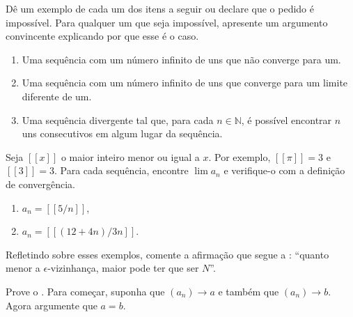 \begin{exercise}\label{ex:2-2-4}
Dê um exemplo de cada um dos itens a seguir ou declare que o pedido é impossível. Para qualquer um que seja impossível, apresente um argumento convincente explicando por que esse é o caso.
\begin{enumerate}[label=\alph*)]
\item Uma sequência com um número infinito de uns que não converge para um.
\item Uma sequência com um número infinito de uns que converge para um limite diferente de um.
\item Uma sequência divergente tal que, para cada $n \in \mathbb{N}$, é possível encontrar $n$ uns consecutivos em algum lugar da sequência.
\end{enumerate}
\end{exercise}

\begin{exercise}\label{ex:2-2-5}
Seja $[[x]]$ o maior inteiro menor ou igual a $x$. Por exemplo, $[[\pi]] = 3$ e $[[3]] = 3$. Para cada sequência, encontre $\lim a_n$ e verifique-o com a definição de convergência.
\begin{enumerate}[label=\alph*)]
\item $a_n = [[5/n]]$,
\item $a_n = [[(12 + 4n)/3n]]$.
\end{enumerate}
Refletindo sobre esses exemplos, comente a afirmação que segue a : ``quanto menor a $\epsilon$-vizinhança, maior pode ter que ser $N$''.
\end{exercise}

\begin{exercise}\label{ex:2-2-6}
Prove o . Para começar, suponha que $(a_n) \to a$ e também que $(a_n) \to b$. Agora argumente que $a = b$.
\end{exercise}

